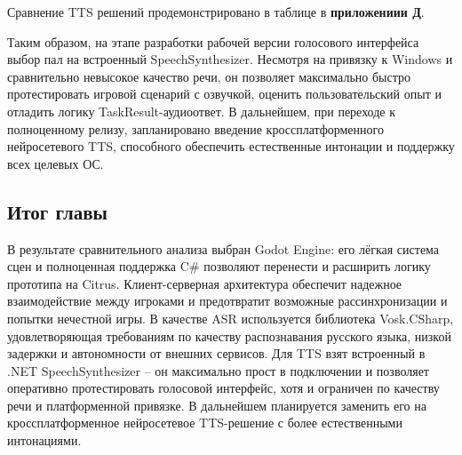        Сравнение TTS решений продемонстрировано в таблице в \textbf{приложениии Д}.


        Таким образом, на этапе разработки рабочей версии голосового интерфейса выбор пал на встроенный SpeechSynthesizer. Несмотря на привязку к Windows и сравнительно невысокое 
        качество речи, он позволяет максимально быстро протестировать игровой сценарий с озвучкой, оценить пользовательский опыт и отладить логику TaskResult-аудиоответ. В дальнейшем, 
        при переходе к полноценному релизу, запланировано введение кроссплатформенного нейросетевого TTS, способного обеспечить естественные интонации и поддержку 
        всех целевых ОС.

    \subsection{Итог главы}
        В результате сравнительного анализа выбран Godot Engine: его лёгкая система сцен и полноценная поддержка C\# позволяют перенести и расширить логику прототипа на Citrus.
        Клиент-серверная архитектура обеспечит надежное взаимодействие между игроками и предотвратит возможные рассинхронизации и попытки нечестной игры.
        В качестве ASR используется библиотека Vosk.CSharp, удовлетворяющая требованиям по качеству распознавания русского языка, низкой задержки и 
        автономности от внешних сервисов. Для TTS взят встроенный в .NET SpeechSynthesizer -- он максимально прост в подключении и позволяет оперативно протестировать 
        голосовой интерфейс, хотя и ограничен по качеству речи и платформенной привязке. В дальнейшем планируется заменить его на кроссплатформенное нейросетевое TTS-решение 
        с более естественными интонациями.
